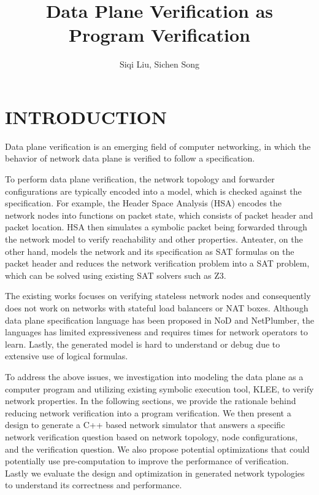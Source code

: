 \documentclass[letterpaper, 10 pt, conference]{ieeeconf}  %
\title{\LARGE \bf
Data Plane Verification as Program Verification
}
\author{Siqi Liu,
Sichen Song
}
\begin{document}
\maketitle
\thispagestyle{empty}
\pagestyle{empty}



\section{INTRODUCTION}
Data plane verification is an emerging field of computer networking, in which the behavior of network data plane is verified to follow a specification. 

To perform data plane verification, the network topology and forwarder configurations are typically encoded into a model, which is checked against the specification. For example, the Header Space Analysis (HSA) encodes the network nodes into functions on packet state, which consists of packet header and packet location. HSA then simulates a symbolic packet being forwarded through the network model to verify reachability and other properties. Anteater, on the other hand, models the network and its specification as SAT formulas on the packet header and reduces the network verification problem into a SAT problem, which can be solved using existing SAT solvers such as Z3.

The existing works focuses on verifying stateless network nodes and consequently does not work on networks with stateful load balancers or NAT boxes. Although data plane specification language has been proposed in NoD and NetPlumber, the languages has limited expressiveness and requires times for network operators to learn. Lastly, the generated model is hard to understand or debug due to extensive use of logical formulas.

To address the above issues, we investigation into modeling the data plane as a computer program and utilizing existing symbolic execution tool, KLEE, to verify network properties. In the following sections, we provide the rationale behind reducing network verification into a program verification. We then present a design to  generate a C++ based network simulator that answers a specific network verification question based on network topology, node configurations, and the verification question. We also propose potential optimizations that could potentially use pre-computation to improve the performance of verification. Lastly we evaluate the design and optimization in generated network typologies to understand its correctness and performance.
\end{document}
